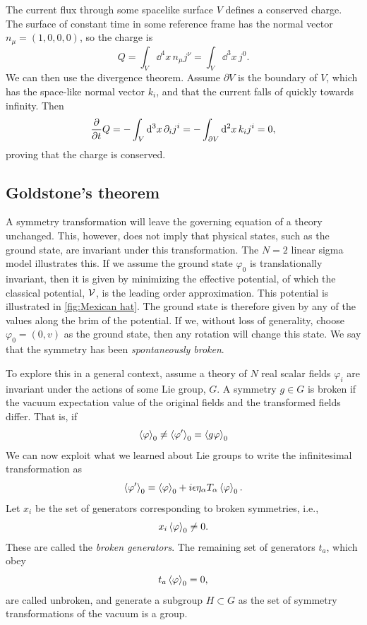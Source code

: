 The current flux through some spacelike surface $V$ defines a conserved charge. The surface of constant time in some reference frame has the normal vector $n_\mu = (1, 0, 0, 0)$, so the charge is
\begin{equation}
    Q = \int_V \dd^4 x \, n_\mu j^\nu = \int_V \dd^3 x \, j^0.
\end{equation}
%
We can then use the divergence theorem.
Assume $\partial V$ is the boundary of $V$, which has the space-like normal vector $k_i$, and that the current falls of quickly towards infinity.
Then
\begin{equation}
    \pdv{t} Q = - \int_V \dd^3 x \, \partial_i j^i = - \int_{\partial V} \dd^2 x\, k_i j^i = 0,
\end{equation}
%
proving that the charge is conserved.

\subsection*{Goldstone's theorem}

A symmetry transformation will leave the governing equation of a theory unchanged.
This, however, does not imply that physical states, such as the ground state, are invariant under this transformation.
The $N = 2$ linear sigma model illustrates this.
If we assume the ground state $\varphi_{0}$ is translationally invariant, then it is given by minimizing the effective potential, of which the classical potential, $\mathcal{V}$, is the leading order approximation.
This potential is illustrated in \autoref{fig:Mexican hat}.
The ground state is therefore given by any of the values along the brim of the potential.
If we, without loss of generality, choose $\varphi_0 = (0, v)$ as the ground state, then any rotation will change this state.
We say that the symmetry has been \emph{spontaneously broken}.

To explore this in a general context, assume a theory of $N$ real scalar fields $\varphi_i$ are invariant under the actions of some Lie group, $G$.
A symmetry $g \in G$ is broken if the vacuum expectation value of the original fields and the transformed fields differ.
That is, if
\begin{equation}
    \ex{\varphi}_0 \neq \ex{\varphi'}_0 = \ex{g \varphi}_0
\end{equation}
%
We can now exploit what we learned about Lie groups to write the infinitesimal transformation as
\begin{equation}
    \ex{\varphi'}_0 = \ex{\varphi}_0 + i \epsilon \eta_\alpha T_\alpha \ex{\varphi}_0.
\end{equation}
%
Let $x_i$ be the set of generators corresponding to broken symmetries, i.e.,
\begin{equation}
    x_i \ex{\varphi}_0 \neq 0.
\end{equation}
%
These are called the \emph{broken generators}.
The remaining set of generators $t_a$, which obey
\begin{equation}
    t_a \ex{\varphi}_0 = 0,
\end{equation}
%
are called unbroken, and generate a subgroup $H \subset G$ as the set of symmetry transformations of the vacuum is a group.

